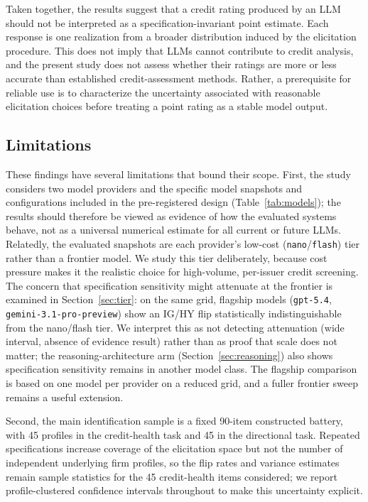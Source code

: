 \documentclass[a4paper,fleqn]{cas-sc}
\begin{document}
Taken together, the results suggest that a credit rating produced by an LLM should not be interpreted as a
specification-invariant point estimate. Each response is one realization from a broader distribution
induced by the elicitation procedure. This does not imply that LLMs cannot contribute to credit analysis,
and the present study does not assess whether their ratings are more or less accurate than established
credit-assessment methods. Rather, a prerequisite for reliable use is to characterize the uncertainty
associated with reasonable elicitation choices before treating a point rating as a stable model output.

\subsection{Limitations}
These findings have several limitations that bound their scope. First, the study considers two model
providers and the specific model snapshots and configurations included in the pre-registered design
(Table~\ref{tab:models}); the results should therefore be viewed as evidence of how the evaluated systems
behave, not as a universal numerical estimate for all current or future LLMs. Relatedly, the evaluated
snapshots are each provider's low-cost (\texttt{nano}/\texttt{flash}) tier rather than a frontier model.
We study this tier deliberately, because cost pressure makes it the realistic choice for high-volume,
per-issuer credit screening. The concern that specification sensitivity might attenuate at the frontier
is examined in Section~\ref{sec:tier}: on the same grid, flagship models
(\texttt{gpt-5.4}, \texttt{gemini-3.1-pro-preview}) show an IG/HY flip statistically indistinguishable
from the nano/flash tier. We interpret this as not detecting attenuation (wide interval, absence of evidence
result) rather than as proof that scale does not matter; the reasoning-architecture arm
(Section~\ref{sec:reasoning}) also shows specification sensitivity remains in another model
class. The flagship comparison is based on one model per provider on a reduced grid, and a fuller frontier
sweep remains a useful extension.

Second, the main identification sample is a fixed 90-item constructed battery, with 45 profiles in the
credit-health task and 45 in the directional task. Repeated specifications increase coverage of the
elicitation space but not the number of independent underlying firm profiles, so the flip rates and
variance estimates remain sample statistics for the 45 credit-health items considered; we report
profile-clustered confidence intervals throughout to make this uncertainty explicit.
\end{document}
